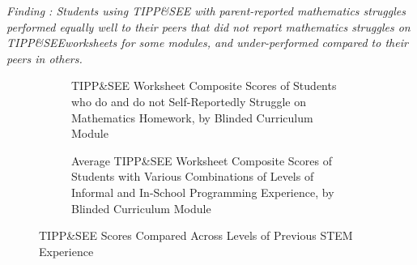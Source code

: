 \documentclass[sigconf,manuscript,review,anonymous]{acmart} %
\def\ts{TIPP\&SEE}
\newcommand{\Scratchencore}[0]{Blinded Curriculum}
\begin{document}
 \textit{Finding : Students using \ts{} with parent-reported mathematics struggles performed equally well to their peers that did not report mathematics struggles on \ts worksheets for some modules, and under-performed compared to their peers in others.}
 
 \begin{figure}
     \centering
    \begin{subfigure}[t]{0.49\textwidth}
        \caption{\ts{} Worksheet Composite Scores of Students who do and do not Self-Reportedly Struggle on Mathematics Homework, by \Scratchencore{} Module}
        \label{fig:math_struggles}
    \end{subfigure}
    \hfill
    \begin{subfigure}[t]{0.49\textwidth}
    \caption{Average \ts{} Worksheet Composite Scores of Students with Various Combinations of Levels of Informal and In-School Programming Experience, by \Scratchencore{} Module} 
    \label{fig:progexp}
    \end{subfigure}
    \caption{\ts{} Scores Compared Across Levels of Previous STEM Experience}
    \label{fig:math_programming}
\end{figure}
\end{document}
